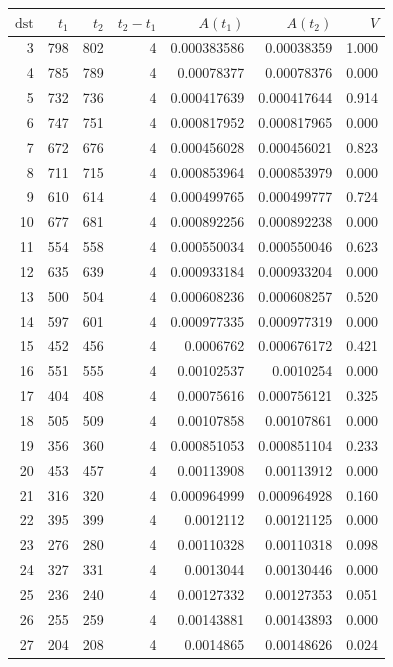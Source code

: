 \begin{tabular}{r r r r r r r}
\toprule
$\mathrm{dst}$ & $t_1$ & $t_2$ & $t_2-t_1$ & $A(t_1)$ & $A(t_2)$ & $V$ \\
\midrule
3 & 798 & 802 & 4 & 0.000383586 & 0.00038359 & 1.000 \\
4 & 785 & 789 & 4 & 0.00078377 & 0.00078376 & 0.000 \\
5 & 732 & 736 & 4 & 0.000417639 & 0.000417644 & 0.914 \\
6 & 747 & 751 & 4 & 0.000817952 & 0.000817965 & 0.000 \\
7 & 672 & 676 & 4 & 0.000456028 & 0.000456021 & 0.823 \\
8 & 711 & 715 & 4 & 0.000853964 & 0.000853979 & 0.000 \\
9 & 610 & 614 & 4 & 0.000499765 & 0.000499777 & 0.724 \\
10 & 677 & 681 & 4 & 0.000892256 & 0.000892238 & 0.000 \\
11 & 554 & 558 & 4 & 0.000550034 & 0.000550046 & 0.623 \\
12 & 635 & 639 & 4 & 0.000933184 & 0.000933204 & 0.000 \\
13 & 500 & 504 & 4 & 0.000608236 & 0.000608257 & 0.520 \\
14 & 597 & 601 & 4 & 0.000977335 & 0.000977319 & 0.000 \\
15 & 452 & 456 & 4 & 0.0006762 & 0.000676172 & 0.421 \\
16 & 551 & 555 & 4 & 0.00102537 & 0.0010254 & 0.000 \\
17 & 404 & 408 & 4 & 0.00075616 & 0.000756121 & 0.325 \\
18 & 505 & 509 & 4 & 0.00107858 & 0.00107861 & 0.000 \\
19 & 356 & 360 & 4 & 0.000851053 & 0.000851104 & 0.233 \\
20 & 453 & 457 & 4 & 0.00113908 & 0.00113912 & 0.000 \\
21 & 316 & 320 & 4 & 0.000964999 & 0.000964928 & 0.160 \\
22 & 395 & 399 & 4 & 0.0012112 & 0.00121125 & 0.000 \\
23 & 276 & 280 & 4 & 0.00110328 & 0.00110318 & 0.098 \\
24 & 327 & 331 & 4 & 0.0013044 & 0.00130446 & 0.000 \\
25 & 236 & 240 & 4 & 0.00127332 & 0.00127353 & 0.051 \\
26 & 255 & 259 & 4 & 0.00143881 & 0.00143893 & 0.000 \\
27 & 204 & 208 & 4 & 0.0014865 & 0.00148626 & 0.024 \\

\end{tabular}
